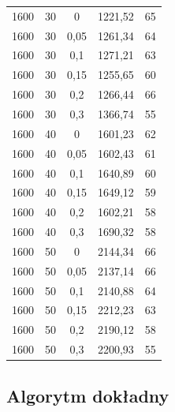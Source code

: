 \documentclass{article}
\begin{document}
\begin{longtable}{c|c|c|c|c}
1600   & 30   & 0     & 1221,52 & 65    \\
1600   & 30   & 0,05  & 1261,34 & 64    \\
1600   & 30   & 0,1   & 1271,21 & 63    \\
1600   & 30   & 0,15  & 1255,65 & 60    \\
1600   & 30   & 0,2   & 1266,44 & 66    \\
1600   & 30   & 0,3   & 1366,74 & 55    \\
1600   & 40   & 0     & 1601,23 & 62    \\
1600   & 40   & 0,05  & 1602,43 & 61    \\
1600   & 40   & 0,1   & 1640,89 & 60    \\
1600   & 40   & 0,15  & 1649,12 & 59    \\
1600   & 40   & 0,2   & 1602,21 & 58    \\
1600   & 40   & 0,3   & 1690,32 & 58    \\
1600   & 50   & 0     & 2144,34 & 66    \\
1600   & 50   & 0,05  & 2137,14 & 66    \\
1600   & 50   & 0,1   & 2140,88 & 64    \\
1600   & 50   & 0,15  & 2212,23 & 63    \\
1600   & 50   & 0,2   & 2190,12 & 58    \\
1600   & 50   & 0,3   & 2200,93 & 55   
\end{longtable}

\subsection{Algorytm dokładny}
\end{document}

